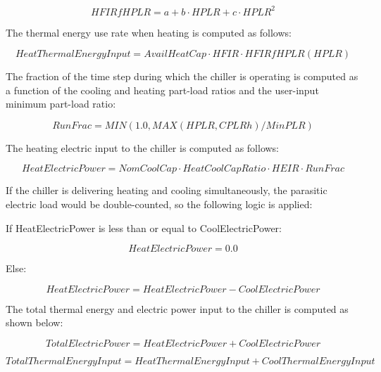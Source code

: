 \begin{equation}
HFIRfHPLR = a + b \cdot HPLR + c \cdot HPL{R^2}
\end{equation}

The thermal energy use rate when heating is computed as follows:

\begin{equation}
HeatThermalEnergyInput = AvailHeatCap \cdot HFIR \cdot HFIRfHPLR(HPLR)
\end{equation}

The fraction of the time step during which the chiller is operating is computed as a function of the cooling and heating part-load ratios and the user-input minimum part-load ratio:

\begin{equation}
RunFrac = MIN(1.0,MAX\left( {HPLR,CPLRh} \right)/MinPLR)
\end{equation}

The heating electric input to the chiller is computed as follows:

\begin{equation}
HeatElectricPower = NomCoolCap \cdot HeatCoolCapRatio \cdot HEIR \cdot RunFrac
\end{equation}

If the chiller is delivering heating and cooling simultaneously, the parasitic electric load would be double-counted, so the following logic is applied:

If HeatElectricPower is less than or equal to CoolElectricPower:

\begin{equation}
  HeatElectricPower = 0.0
\end{equation}

Else:

\begin{equation}
  HeatElectricPower = HeatElectricPower - CoolElectricPower
\end{equation}

The total thermal energy and electric power input to the chiller is computed as shown below:

\begin{equation}
TotalElectricPower = HeatElectricPower + CoolElectricPower
\end{equation}

\begin{equation}
TotalThermalEnergyInput = HeatThermalEnergyInput + CoolThermalEnergyInput
\end{equation}

